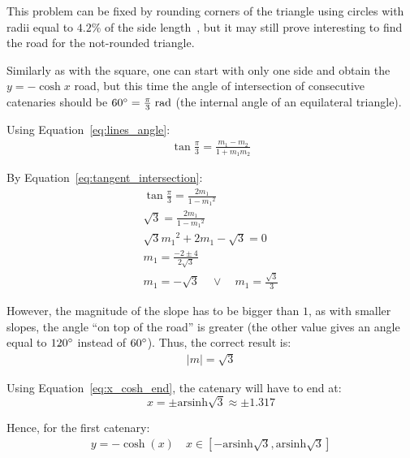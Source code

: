\documentclass[12pt]{article}
\begin{document}
        This problem can be fixed by rounding corners of the triangle using circles with radii equal to $4.2\%$ of the side length~\cite{Hall_Wagon_1992,bridge_wolfram}, but it may still prove interesting to find the road for the not-rounded triangle.

        Similarly as with the square, one can start with only one side and obtain the $y= -\cosh x$ road, but this time the angle of intersection of consecutive catenaries should be $60\degree = \frac{\pi}{3} \;\text{rad}$ (the internal angle of an equilateral triangle).

        Using Equation~\ref{eq:lines_angle}:
        \begin{align}
            \tan \frac{\pi}{3} = \frac{m_1 - m_2}{1 + m_1 m_2}
        \end{align}

        By Equation~\ref{eq:tangent_intersection}:
        \begin{align}
            \tan \frac{\pi}{3} = \frac{2 m_1}{1 - {m_1}^2} \\
            \sqrt{3} = \frac{2 m_1}{1 - {m_1}^2} \\
            \sqrt{3} {m_1}^2 + 2 m_1 - \sqrt{3} = 0 \\
            m_1 = \frac{-2 \pm 4}{2 \sqrt{3}} \\
            m_1 = - \sqrt{3} \quad \lor \quad m_1 = \frac{\sqrt{3}}{3}
        \end{align}

        However, the magnitude of the slope has to be bigger than $1$, as with smaller slopes, the angle ``on top of the road'' is greater (the other value gives an angle equal to $120\degree$ instead of $60\degree$). Thus, the correct result is:
        \begin{align*}
            |m| = \sqrt{3}
        \end{align*}

        Using Equation~\ref{eq:x_cosh_end}, the catenary will have to end at:
        \begin{equation}
            x = \pm \text{arsinh}\sqrt{3} \approx \pm 1.317
        \end{equation}

        Hence, for the first catenary:
        \begin{align}
            y = -\cosh(x) \quad x \in [-\text{arsinh}\sqrt{3}, \text{arsinh}\sqrt{3}]
        \end{align}
\end{document}
